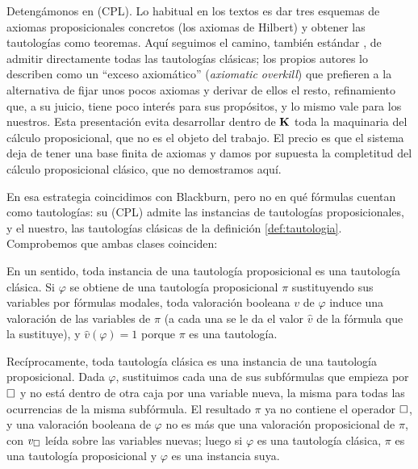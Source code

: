 \begin{observacion}
Detengámonos en (CPL). Lo habitual en los textos es dar tres esquemas de axiomas proposicionales concretos (los axiomas de Hilbert) y obtener las tautologías como teoremas. Aquí seguimos el camino, también estándar \cite[p.~33]{blackburn}, de admitir directamente todas las tautologías clásicas; los propios autores lo describen como un ``exceso axiomático'' (\emph{axiomatic overkill}) que prefieren a la alternativa de fijar unos pocos axiomas y derivar de ellos el resto, refinamiento que, a su juicio, tiene poco interés para sus propósitos, y lo mismo vale para los nuestros. Esta presentación evita desarrollar dentro de $\mathbf{K}$ toda la maquinaria del cálculo proposicional, que no es el objeto del trabajo. El precio es que el sistema deja de tener una base finita de axiomas y damos por supuesta la completitud del cálculo proposicional clásico, que no demostramos aquí.

En esa estrategia coincidimos con Blackburn, pero no en qué fórmulas cuentan como tautologías: su (CPL) admite las instancias de tautologías proposicionales, y el nuestro, las tautologías clásicas de la definición \ref{def:tautologia}. Comprobemos que ambas clases coinciden:

En un sentido, toda instancia de una tautología proposicional es una tautología clásica. Si $\varphi$ se obtiene de una tautología proposicional $\pi$ sustituyendo sus variables por fórmulas modales, toda valoración booleana $v$ de $\varphi$ induce una valoración de las variables de $\pi$ (a cada una se le da el valor $\hat{v}$ de la fórmula que la sustituye), y $\hat{v}(\varphi) = 1$ porque $\pi$ es una tautología.

Recíprocamente, toda tautología clásica es una instancia de una tautología proposicional. Dada $\varphi$, sustituimos cada una de sus subfórmulas que empieza por $\square$ y no está dentro de otra caja por una variable nueva, la misma para todas las ocurrencias de la misma subfórmula. El resultado $\pi$ ya no contiene el operador $\square$, y una valoración booleana de $\varphi$ no es más que una valoración proposicional de $\pi$, con $v_\square$ leída sobre las variables nuevas; luego si $\varphi$ es una tautología clásica, $\pi$ es una tautología proposicional y $\varphi$ es una instancia suya.
\end{observacion}

